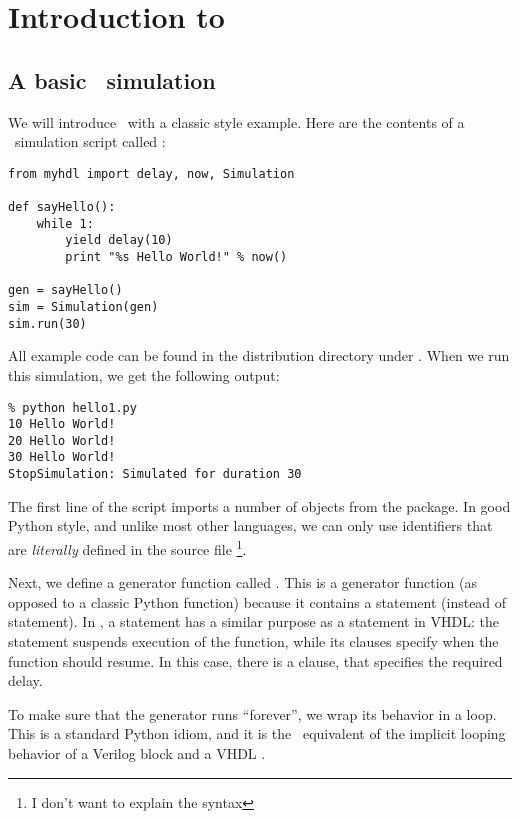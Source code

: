 \chapter{Introduction to \myhdl\ }

\section{A basic \myhdl\ simulation}

We will introduce \myhdl\ with a classic  style
example. Here are the contents of a \myhdl\ simulation script called
:

\begin{verbatim}
from myhdl import delay, now, Simulation

def sayHello():
    while 1:
        yield delay(10)
        print "%s Hello World!" % now()

gen = sayHello()
sim = Simulation(gen)
sim.run(30)

\end{verbatim}

All example code can be found in the distribution directory under
.  When we run this simulation, we get the
following output:

\begin{verbatim}
% python hello1.py
10 Hello World!
20 Hello World!
30 Hello World!
StopSimulation: Simulated for duration 30

\end{verbatim}

The first line of the script imports a
number of objects from the  package. In good Python style, and
unlike most other languages, we can only use identifiers that are
\emph{literally} defined in the source file \footnote{I don't want to
explain the  syntax}. 

Next, we define a generator function called
. This is a generator function (as opposed to
a classic Python function) because it contains a 
statement (instead of  statement). In \myhdl{}, a
 statement has a similar purpose as a 
statement in VHDL: the statement suspends execution of the function,
while its clauses specify when the function should resume. In this case,
there is a  clause, that specifies the required delay.

To make sure that the generator runs ``forever'', we wrap its behavior
in a  loop. This is a standard Python idiom, and it is
the \myhdl\ equivalent of the implicit looping behavior of a Verilog
 block and a VHDL .

